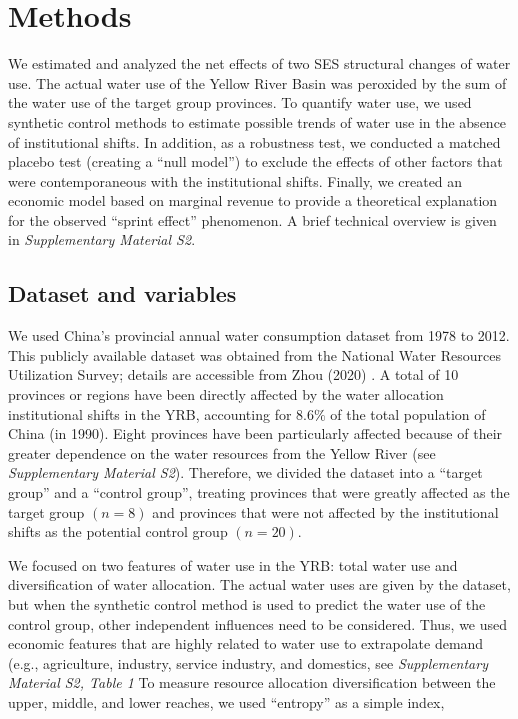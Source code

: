 \documentclass{nsr}
\begin{document}
\section{Methods}
We estimated and analyzed the net effects of two SES structural changes of water use. The actual water use of the Yellow River Basin was peroxided by the sum of the water use of the target group provinces. To quantify water use, we used synthetic control methods to estimate possible trends of water use in the absence of institutional shifts. In addition, as a robustness test, we conducted a matched placebo test (creating a “null model”) to exclude the effects of other factors that were contemporaneous with the institutional shifts. Finally, we created an economic model based on marginal revenue to provide a theoretical explanation for the observed “sprint effect” phenomenon. A brief technical overview is given in \textit{Supplementary Material S2}.

\subsection{Dataset and variables}
We used China’s provincial annual water consumption dataset from 1978 to 2012. This publicly available dataset was obtained from the National Water Resources Utilization Survey; details are accessible from Zhou (2020)
\cite{zhouDecelerationChinahuman2020}.
A total of 10 provinces or regions have been directly affected by the water allocation institutional shifts in the YRB, accounting for $8.6\%$ of the total population of China (in 1990). Eight provinces have been particularly affected because of their greater dependence on the water resources from the Yellow River (see \textit{Supplementary Material S2}). Therefore, we divided the dataset into a “target group” and a “control group”, treating provinces that were greatly affected as the target group $(n=8)$ and provinces that were not affected by the institutional shifts as the potential control group $(n=20)$.

We focused on two features of water use in the YRB: total water use and diversification of water allocation. The actual water uses are given by the dataset, but when the synthetic control method is used to predict the water use of the control group, other independent influences need to be considered. Thus, we used economic features that are highly related to water use to extrapolate demand (e.g., agriculture, industry, service industry, and domestics, see \textit{Supplementary Material S2, Table 1} To measure resource allocation diversification between the upper, middle, and lower reaches, we used “entropy” as a simple index,
\end{document}
